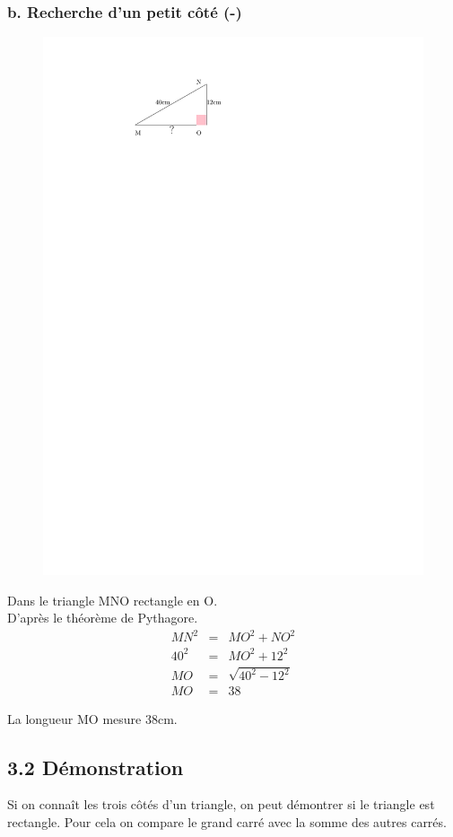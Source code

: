 \documentclass[12pt]{article}
\begin{document}
\begin{multicols}{2}
	\subsubsection*{b. Recherche d'un petit côté (-)}

	\begin{figure}[H]
		\centering
		\includegraphics[width=0.5\linewidth]{3x6-pythagore/sources/re-c.pdf}
	\end{figure}

	Dans le triangle MNO rectangle en O.\\
	D'après le théorème de Pythagore.
	\begin{eqnarray*}
		MN^2 &=& MO^2 + NO^2 \\
		40^2 &=& MO^2 + 12^2 \\
		MO   &=& \sqrt{40^2 - 12^2} \\
		MO   &=& 38
	\end{eqnarray*}

	La longueur MO mesure 38cm.

\end{multicols}


\subsection*{3.2 Démonstration}

Si on connaît les trois côtés d'un triangle, on peut démontrer si le triangle est rectangle. Pour cela on compare le grand carré avec la somme des autres carrés.
\end{document}

